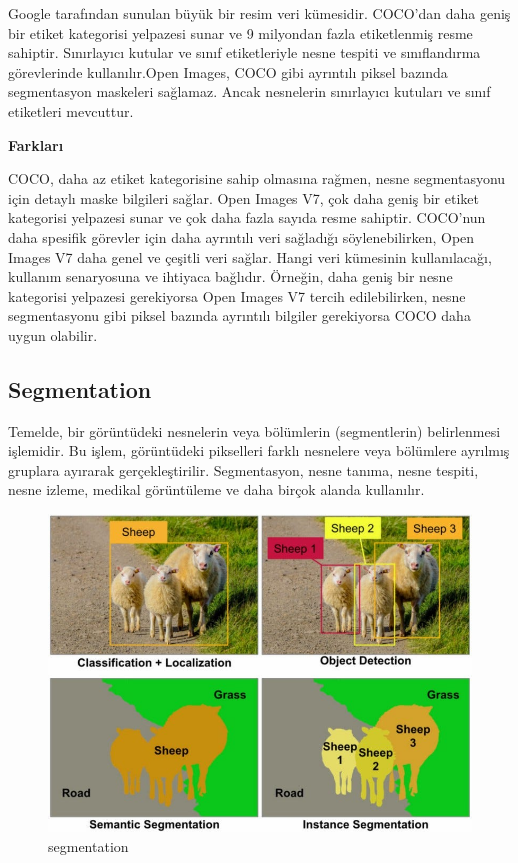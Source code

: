 \documentclass[11pt,a4paper]{report}
\begin{document}
    Google tarafından sunulan büyük bir resim veri kümesidir. COCO'dan daha geniş bir etiket kategorisi yelpazesi sunar ve 9 milyondan fazla etiketlenmiş resme sahiptir. Sınırlayıcı kutular ve sınıf etiketleriyle nesne tespiti ve sınıflandırma görevlerinde kullanılır.Open Images, COCO gibi ayrıntılı piksel bazında segmentasyon maskeleri sağlamaz. Ancak nesnelerin sınırlayıcı kutuları ve sınıf etiketleri mevcuttur.
    \newline
    
    \textbf{ Farkları}
    \newline
    
    COCO, daha az etiket kategorisine sahip olmasına rağmen, nesne segmentasyonu için detaylı maske bilgileri sağlar.
    Open Images V7, çok daha geniş bir etiket kategorisi yelpazesi sunar ve çok daha fazla sayıda resme sahiptir.
    COCO'nun daha spesifik görevler için daha ayrıntılı veri sağladığı söylenebilirken, Open Images V7 daha genel ve çeşitli veri sağlar.
    Hangi veri kümesinin kullanılacağı, kullanım senaryosuna ve ihtiyaca bağlıdır. Örneğin, daha geniş bir nesne kategorisi yelpazesi gerekiyorsa Open Images V7 tercih edilebilirken, nesne segmentasyonu gibi piksel bazında ayrıntılı bilgiler gerekiyorsa COCO daha uygun olabilir.\cite{ultralytics}
    \newpage
    
    \subsection{Segmentation}
    
    Temelde, bir görüntüdeki nesnelerin veya bölümlerin (segmentlerin) belirlenmesi işlemidir. Bu işlem, görüntüdeki pikselleri farklı nesnelere veya bölümlere ayrılmış gruplara ayırarak gerçekleştirilir. Segmentasyon, nesne tanıma, nesne tespiti, nesne izleme, medikal görüntüleme ve daha birçok alanda kullanılır.
    
    \begin{figure}[!h]
    	\centering
    	\includegraphics[width=\textwidth]{segmentation-1}
    	\caption{segmentation}
    	\label{fig:ornek6}
    \end{figure}
    
\end{document}
